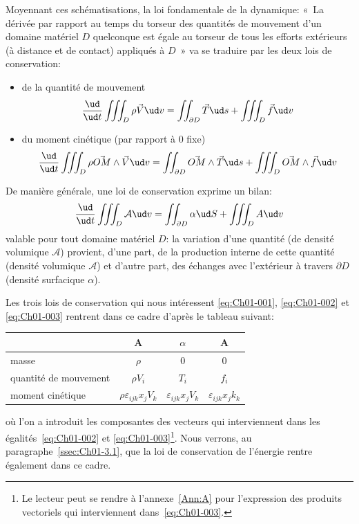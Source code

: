 Moyennant ces schématisations, la loi fondamentale de la dynamique: «~La dérivée par rapport au temps du torseur des quantités de mouvement d'un domaine matériel $D$ quelconque est égale au torseur de tous les efforts extérieurs (à distance et de contact) appliqués à $D$~» va se traduire par les deux lois de conservation:
\begin{itemize}
    \item de la quantité de mouvement
        \begin{equation}
            \frac{\ud}{\ud t}\iiint_D \rho\vec{V} \ud v =\iint_{\partial D}\vec{T}\ud s+\iiint_D\vec{f}\ud v
            \label{eq:Ch01-002}
        \end{equation}
    \item du moment cinétique (par rapport à 0 fixe)
        \begin{equation}
            \frac{\ud}{\ud t}\iiint_D \rho\vec{OM}\wedge\vec{V} \ud v =\iint_{\partial D}\vec{OM}\wedge\vec{T}\ud s+\iiint_D\vec{OM}\wedge\vec{f}\ud v
            \label{eq:Ch01-003}
        \end{equation}
\end{itemize}
De manière générale, une loi de conservation exprime un bilan:
\begin{equation}
    \frac{\ud}{\ud t}\iiint_D \mathcal{A} \ud v =\iint_{\partial D}\alpha\ud S +\iiint_D A\ud v
    \label{eq:Ch01-004}
\end{equation}
valable pour tout domaine matériel $D$: la variation d'une quantité (de densité volumique $\mathcal{A}$) provient, d'une part, de la production interne de cette quantité (densité volumique $\mathcal{A}$) et d'autre part, des échanges avec l'extérieur à travers $\partial D$ (densité surfacique $\alpha$).

Les trois lois de conservation qui nous intéressent \eqref{eq:Ch01-001}, \eqref{eq:Ch01-002} et \eqref{eq:Ch01-003} rentrent dans ce cadre d'après le tableau suivant:
\begin{table}[h]\centering
    \begin{tabular}{l|c|c|c|}
        & A & $\alpha$ & A \\\hline
        masse & $\rho$ & 0 & 0\\\hline
        quantité de mouvement & $\rho V_i$ & $T_i$ & $f_i$ \\\hline
        moment cinétique & $\rho \varepsilon_{ijk}x_j V_k$ & $\varepsilon_{ijk}x_j V_k$ & $\varepsilon_{ijk}x_j k_k$
    \end{tabular}
\end{table}
où l'on a introduit les composantes des vecteurs qui interviennent dans les égalités~\eqref{eq:Ch01-002} et \eqref{eq:Ch01-003}\footnote{Le lecteur peut se rendre à l'annexe~\ref{Ann:A} pour l'expression des produits vectoriels qui interviennent dans~\eqref{eq:Ch01-003}.}.
Nous verrons, au paragraphe~\ref{ssec:Ch01-3.1}, que la loi de conservation de l'énergie rentre également dans ce cadre.
